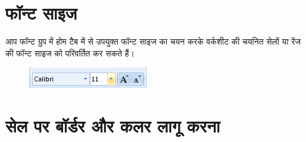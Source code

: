 \section{फॉन्ट साइज}\label{id-2.3}

आप फॉन्ट ग्रुप में होम टैब में से उपयुक्त फॉन्ट साइज का चयन करके वर्कशीट की चयनित सेलों या रेंज की फॉन्ट साइज को परिवर्तित कर सकते हैं।
\begin{figure}[H]
\centering
\includegraphics[scale=.8]{src/images/chapter2/chapter2_fig07.png}
\end{figure}

\section{सेल पर बॉर्डर और कलर लागू करना}\label{id-2.4}

